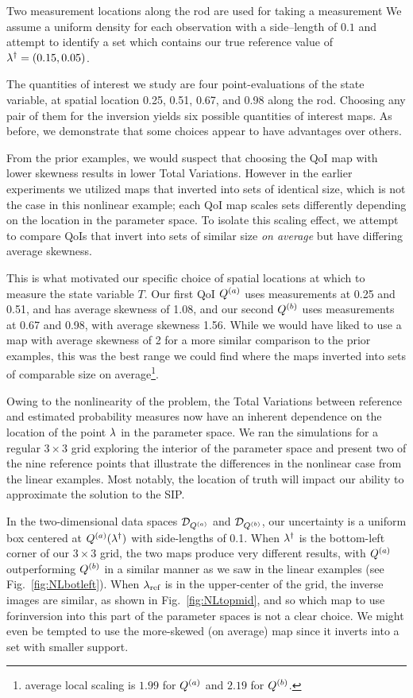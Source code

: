 Two measurement locations along the rod are used for taking a measurement
We assume a uniform density for each observation with a side--length of $0.1$ and attempt to identify a set which contains our true reference value of $\lambda^\dagger = (0.15, 0.05)$.

The quantities of interest we study are four point-evaluations of the state variable, at spatial location 0.25, 0.51, 0.67, and 0.98 along the rod.
Choosing any pair of them for the inversion yields six possible quantities of interest maps.
As before, we demonstrate that some choices appear to have advantages over others.

From the prior examples, we would suspect that choosing the QoI map with lower skewness results in lower Total Variations.
However in the earlier experiments we utilized maps that inverted into sets of identical size, which is not the case in this nonlinear example; each QoI map scales sets differently depending on the location in the parameter space.
To isolate this scaling effect, we attempt to compare QoIs that invert into sets of similar size \emph{on average} but have differing average skewness.

This is what motivated our specific choice of spatial locations at which to measure the state variable $T$.
Our first QoI $Q^{(a)}$ uses measurements at 0.25 and 0.51, and has average skewness of 1.08, and our second $Q^{(b)}$ uses measurements at 0.67 and 0.98, with average skewness 1.56.
While we would have liked to use a map with average skewness of 2 for a more similar comparison to the prior examples, this was the best range we could find where the maps inverted into sets of comparable size on average\footnote{average local scaling is $1.99$ for $Q^{(a)}$ and $2.19$ for $Q^{(b)}$.}.

Owing to the nonlinearity of the problem, the Total Variations between reference and estimated probability measures now have an inherent dependence on the location of the point $\lambda$ in the parameter space.
We ran the simulations for a regular $3\times3$ grid exploring the interior of the parameter space and present two of the nine reference points that illustrate the differences in the nonlinear case from the linear examples.
Most notably, the location of truth will impact our ability to approximate the solution to the SIP.

In the two-dimensional data spaces $\mathcal{D}_{Q^{(a)}}$ and $\mathcal{D}_{Q^{(b)}}$, our uncertainty is a uniform box centered at $Q^{(a)}(\lambda^\dagger)$ with side-lengths of 0.1.
When $\lambda^\dagger$ is the bottom-left corner of our $3\times3$ grid, the two maps produce very different results, with $Q^{(a)}$ outperforming $Q^{(b)}$ in a similar manner as we saw in the linear examples (see Fig.~\ref{fig:NLbotleft}).
When $\lambda_{\text{ref}}$ is in the upper-center of the grid, the inverse images are similar, as shown in Fig.~\ref{fig:NLtopmid}, and so which map to use forinversion into this part of the parameter spaces is not a clear choice. We might even be tempted to use the more-skewed (on average) map since it inverts into a set with smaller support.


